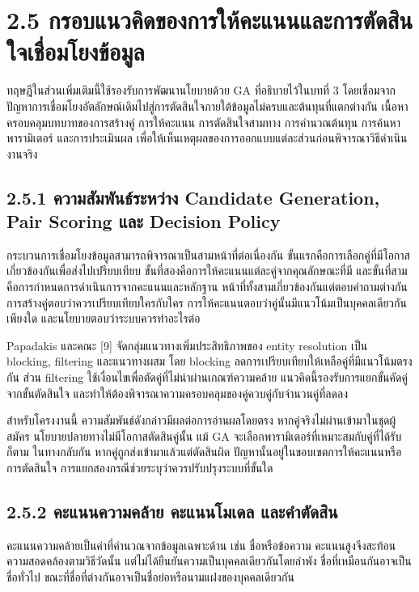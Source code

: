 \section*{2.5 กรอบแนวคิดของการให้คะแนนและการตัดสินใจเชื่อมโยงข้อมูล}
ทฤษฎีในส่วนเพิ่มเติมนี้ใช้รองรับการพัฒนานโยบายด้วย GA ที่อธิบายไว้ในบทที่ 3 โดยเชื่อมจากปัญหาการเชื่อมโยงอัตลักษณ์เดิมไปสู่การตัดสินใจภายใต้ข้อมูลไม่ครบและต้นทุนที่แตกต่างกัน เนื้อหาครอบคลุมบทบาทของการสร้างคู่ การให้คะแนน การตัดสินใจสามทาง การคำนวณต้นทุน การค้นหาพารามิเตอร์ และการประเมินผล เพื่อให้เห็นเหตุผลของการออกแบบแต่ละส่วนก่อนพิจารณาวิธีดำเนินงานจริง

\subsection*{2.5.1 ความสัมพันธ์ระหว่าง Candidate Generation, Pair Scoring และ Decision Policy}
กระบวนการเชื่อมโยงข้อมูลสามารถพิจารณาเป็นสามหน้าที่ต่อเนื่องกัน ขั้นแรกคือการเลือกคู่ที่มีโอกาสเกี่ยวข้องกันเพื่อส่งไปเปรียบเทียบ ขั้นที่สองคือการให้คะแนนแต่ละคู่จากคุณลักษณะที่มี และขั้นที่สามคือการกำหนดการดำเนินการจากคะแนนและหลักฐาน หน้าที่ทั้งสามเกี่ยวข้องกันแต่ตอบคำถามต่างกัน การสร้างคู่ตอบว่าควรเปรียบเทียบใครกับใคร การให้คะแนนตอบว่าคู่นั้นมีแนวโน้มเป็นบุคคลเดียวกันเพียงใด และนโยบายตอบว่าระบบควรทำอะไรต่อ

Papadakis และคณะ [9] จัดกลุ่มแนวทางเพิ่มประสิทธิภาพของ entity resolution เป็น blocking, filtering และแนวทางผสม โดย blocking ลดการเปรียบเทียบให้เหลือคู่ที่มีแนวโน้มตรงกัน ส่วน filtering ใช้เงื่อนไขเพื่อตัดคู่ที่ไม่น่าผ่านเกณฑ์ความคล้าย แนวคิดนี้รองรับการแยกขั้นคัดคู่จากขั้นตัดสินใจ และทำให้ต้องพิจารณาความครอบคลุมของคู่ควบคู่กับจำนวนคู่ที่ลดลง

สำหรับโครงงานนี้ ความสัมพันธ์ดังกล่าวมีผลต่อการอ่านผลโดยตรง หากคู่จริงไม่ผ่านเข้ามาในชุดผู้สมัคร นโยบายปลายทางไม่มีโอกาสตัดสินคู่นั้น แม้ GA จะเลือกพารามิเตอร์ที่เหมาะสมกับคู่ที่ได้รับก็ตาม ในทางกลับกัน หากคู่ถูกส่งเข้ามาแล้วแต่ตัดสินผิด ปัญหานั้นอยู่ในขอบเขตการให้คะแนนหรือการตัดสินใจ การแยกสองกรณีช่วยระบุว่าควรปรับปรุงระบบที่ขั้นใด

\subsection*{2.5.2 คะแนนความคล้าย คะแนนโมเดล และคำตัดสิน}
คะแนนความคล้ายเป็นค่าที่คำนวณจากข้อมูลเฉพาะด้าน เช่น ชื่อหรือข้อความ คะแนนสูงจึงสะท้อนความสอดคล้องตามวิธีวัดนั้น แต่ไม่ได้ยืนยันความเป็นบุคคลเดียวกันโดยลำพัง ชื่อที่เหมือนกันอาจเป็นชื่อทั่วไป ขณะที่ชื่อที่ต่างกันอาจเป็นชื่อย่อหรือนามแฝงของบุคคลเดียวกัน

